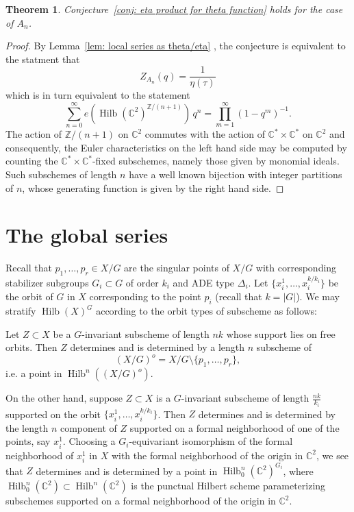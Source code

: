 \documentclass{article}
\newtheorem{theorem}{Theorem}[section]
\theoremstyle{definition}
\newcommand{\CC} {{\mathbb C}}          %
\newcommand{\ZZ} {{\mathbb Z}}		%
\newcommand{\Hilb}{\operatorname{Hilb}}
\begin{document}
\begin{theorem}\label{thm: conjecture holds for An}
Conjecture~\ref{conj: eta product for theta function} holds for the
case of $A_{n}$. 
\end{theorem}

\begin{proof}
By Lemma~\ref{lem: local series as theta/eta} , the conjecture is
equivalent to the statment that 
\[
Z_{A_{n}}(q) = \frac{1}{\eta (\tau )}
\]
which is in turn equivalent to the statement
\[
\sum_{n=0}^{\infty} e\left(\Hilb (\CC^{2})^{\ZZ /(n+1)} \right)
\,q^{n} = \prod_{m=1}^{\infty} (1-q^{m})^{-1}.
\]
The action of $\ZZ /(n+1)$ on $\CC^{2}$ commutes with the action of
$\CC^{*}\times \CC^{*}$ on $\CC^{2}$ and consequently, the Euler
characteristics on the left hand side may be computed by counting
the $\CC^{*}\times \CC^{*}$-fixed subschemes, namely those given by
monomial ideals. Such subschemes of length $n$ have a well known
bijection with integer partitions of $n$, whose generating function is
given by the right hand side.
\end{proof}



\section{The global series}\label{sec: the global series}

Recall that $p_{1},\dotsc ,p_{r}\in X/G$ are the singular points of
$X/G$ with corresponding stabilizer subgroups $G_{i}\subset G$ of
order $k_{i}$ and ADE type $\Delta_{i}$. Let $\{x_{i}^{1},\dotsc
,x_{i}^{k/k_{i}} \}$ be the orbit of $G$ in $X$ corresponding to the
point $p_{i}$ (recall that $k=|G|$).  We may stratify $\Hilb (X)^{G}$
according to the orbit types of subscheme as follows:

Let $Z\subset X$ be a $G$-invariant subscheme of length $nk$ whose
support lies on free orbits. Then $Z$ determines and is determined by
a length $n$ subscheme of 
\[
(X/G)^{o}  = X/G\setminus \{p_{1},\dotsc ,p_{r} \},
\]
i.e. a point
in $\Hilb^{n}((X/G)^{o})$.

On the other hand, suppose $Z\subset X$ is a $G$-invariant subscheme
of length $\frac{nk}{k_{i}}$ supported on the orbit
$\{x_{i}^{1},\dotsc ,x_{i}^{k/k_{i}} \}$. Then $Z$ determines and is
determined by the length $n$ component of $Z$ supported on a formal
neighborhood of one of the points, say $x_{i}^{1}$. Choosing a
$G_{i}$-equivariant isomorphism of the formal neighborhood of
$x_{i}^{1}$ in $X$ with the formal neighborhood of the origin in
$\CC^{2}$, we see that $Z$ determines and is determined by a point in
$\Hilb_{0}^{n}(\CC^{2})^{G_{i}}$, where $\Hilb_{0}^{n}(\CC^{2})\subset
\Hilb^{n}(\CC^{2})$ is the punctual Hilbert scheme parameterizing
subschemes supported on a formal neighborhood of the origin in
$\CC^{2}$.
\end{document}
